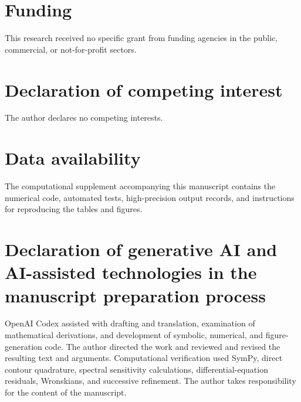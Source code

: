 \section*{Funding}
This research received no specific grant from funding agencies in the
public, commercial, or not-for-profit sectors.

\section*{Declaration of competing interest}
The author declares no competing interests.

\section*{Data availability}
The computational supplement accompanying this manuscript contains
the numerical code, automated tests, high-precision output records,
and instructions for reproducing the tables and figures.

\section*{Declaration of generative AI and AI-assisted technologies in the manuscript preparation process}
OpenAI Codex assisted with drafting and translation, examination of
mathematical derivations, and development of symbolic, numerical,
and figure-generation code. The author directed the work and reviewed
and revised the resulting text and arguments. Computational verification
used SymPy, direct contour quadrature, spectral sensitivity calculations,
differential-equation residuals, Wronskians, and successive refinement.
The author takes responsibility for the content of the manuscript.
